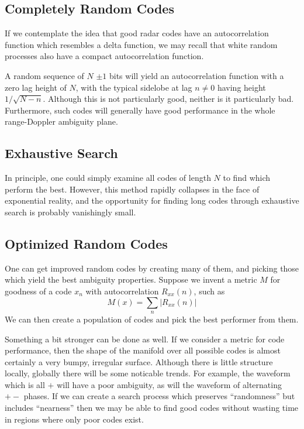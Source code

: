 \subsection{Completely Random Codes}

If we contemplate the idea that good radar codes have an
autocorrelation function which resembles a delta function, we may
recall that white random processes also have a compact autocorrelation
function.  

A random sequence of $N$ $\pm 1$ bits will yield an autocorrelation
function with a zero lag height of $N$, with the typical sidelobe at
lag $n \ne 0$ having height $1/\sqrt{N-n}$.  Although this is not
particularly good, neither is it particularly bad.  Furthermore, such
codes will generally have good performance in the whole range-Doppler
ambiguity plane.

\subsection{Exhaustive Search}

In principle, one could simply examine all codes of length $N$ to find
which perform the best.  However, this method rapidly collapses in the
face of exponential reality, and the opportunity for finding long
codes through exhaustive search is probably vanishingly small.

\subsection{Optimized Random Codes}

One can get improved random codes by creating many of them, and
picking those which yield the best ambiguity properties.  Suppose we
invent a metric $M$ for goodness of a code $x_n$ with autocorrelation
$R_{xx}(n)$, such as 
\begin{equation}
M(x) = \sum_n |R_{xx}(n)|
\end{equation}
We can then create a population of codes and pick the best performer
from them.

Something a bit stronger can be done as well.  If we consider a metric
for code performance, then the shape of the manifold over all possible
codes is almost certainly a very bumpy, irregular surface.  Although
there is little structure locally, globally there will be some
noticable trends.  For example, the waveform which is all $+$ will
have a poor ambiguity, as will the waveform of alternating $+-$
phases.  If we can create a search process which preserves
``randomness'' but includes ``nearness'' then we may be able to find
good codes without wasting time in regions where only poor codes
exist.

